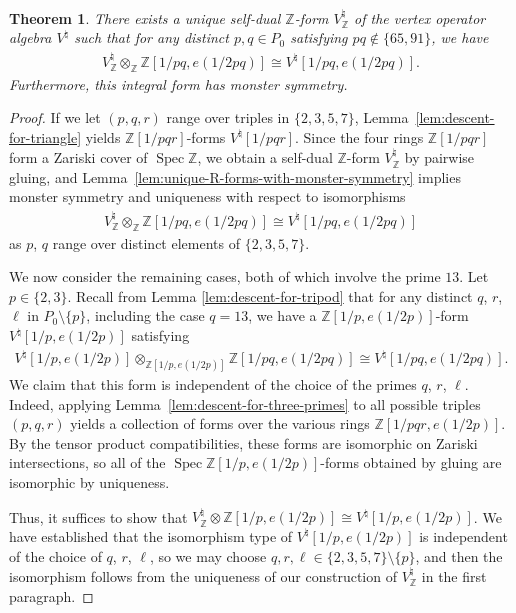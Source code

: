 \documentclass[11pt]{article}
\newcommand{\bZ}{\mathbb{Z}}
\DeclareMathOperator{\Spec}{Spec}
\newtheorem{thm}{Theorem}[section]
\theoremstyle{definition}
\begin{document}
\begin{thm} \label{thm:integral-form-for-moonshine}There exists a unique self-dual $\bZ$-form $V^\natural_{\bZ}$ of the vertex operator algebra $V^\natural$ such that for any distinct $p,q \in P_0$ satisfying $pq \not\in \{65, 91\}$, we have
\begin{gather*} V^\natural_{\bZ} \otimes_{\bZ} \bZ[1/pq, e(1/2pq)] \cong V^\natural[1/pq, e(1/2pq)]. \end{gather*}
Furthermore, this integral form has monster symmetry.
\end{thm}
\begin{proof}If we let $(p,q,r)$ range over triples in $\{2,3,5,7\}$, Lemma~\ref{lem:descent-for-triangle} yields $\bZ[1/pqr]$-forms $V^\natural[1/pqr]$. Since the four rings $\bZ[1/pqr]$ form a Zariski cover of $\Spec \bZ$, we obtain a self-dual $\bZ$-form $V^\natural_\bZ$ by pairwise gluing, and Lemma~\ref{lem:unique-R-forms-with-monster-symmetry} implies monster symmetry and uniqueness with respect to isomorphisms
\begin{gather*} V^\natural_{\bZ} \otimes_{\bZ} \bZ[1/pq, e(1/2pq)] \cong V^\natural[1/pq, e(1/2pq)] \end{gather*}
as $p$, $q$ range over distinct elements of $\{2,3,5,7\}$.

We now consider the remaining cases, both of which involve the prime $13$. Let $p \in \{2,3\}$. Recall from Lemma \ref{lem:descent-for-tripod} that for any distinct $q$, $r$, $\ell$ in $P_0 \setminus \{p\}$, including the case $q=13$, we have a $\bZ[1/p,e(1/2p)]$-form $V^\natural[1/p, e(1/2p)]$ satisfying
\begin{gather*} V^\natural[1/p, e(1/2p)] \otimes_{\bZ[1/p, e(1/2p)]} \bZ[1/pq, e(1/2pq)] \cong V^\natural[1/pq, e(1/2pq)]. \end{gather*}
We claim that this form is independent of the choice of the primes $q$, $r$, $\ell$. Indeed, ap\-plying Lemma~\ref{lem:descent-for-three-primes} to all possible triples $(p,q,r)$ yields a collection of forms over the various rings $\bZ[1/pqr, e(1/2p)]$. By the tensor product compatibilities, these forms are isomorphic on Zariski intersections, so all of the $\Spec \bZ[1/p,e(1/2p)]$-forms obtained by gluing are isomorphic by uniqueness.

Thus, it suffices to show that $V^\natural_{\bZ} \otimes \bZ[1/p, e(1/2p)] \cong V^\natural[1/p, e(1/2p)]$. We have established that the isomorphism type of $V^\natural[1/p, e(1/2p)]$ is independent of the choice of $q$, $r$, $\ell$, so we may choose $q,r,\ell \in \{2,3,5,7\} \setminus \{p\}$, and then the isomorphism follows from the uniqueness of our construction of $V^\natural_{\bZ}$ in the first paragraph.
\end{proof}
\end{document}
